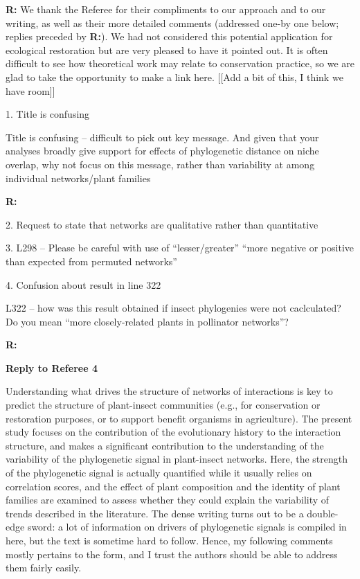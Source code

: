 \documentclass[12pt]{letter}
\newenvironment{refquote}{\bigskip \begin{it}}{\end{it}\smallskip}
\begin{document}
	\textbf{R:} We thank the Referee for their compliments to our approach and to our writing, as well as their more detailed comments (addressed one-by one below; replies preceded by \textbf{R:}). We had not considered this potential application for ecological restoration but are very pleased to have it pointed out. It is often difficult to see how theoretical work may relate to conservation practice, so we are glad to take the opportunity to make a link here. [[Add a bit of this, I think we have room]]

	1. Title is confusing

		\begin{refquote}
			Title is confusing – difficult to pick out key message. And given that your analyses broadly give support for effects of phylogenetic distance on niche overlap, why not focus on this message, rather than variability at among individual networks/plant families
		\end{refquote}


		\textbf{R:} 


	2. Request to state that networks are qualitative rather than quantitative


	3. L298 – Please be careful with use of “lesser/greater” “more negative or positive than expected from permuted networks”


	4. Confusion about result in line 322
		
		\begin{refquote}
			L322 – how was this result obtained if insect phylogenies were not caclculated? Do you mean “more closely-related plants in pollinator networks”?
		\end{refquote}


		\textbf{R:}

\clearpage


{\Large \bf Reply to Referee 4}

	\begin{refquote}
		Understanding what drives the structure of networks of interactions is key to predict the structure of plant-insect communities (e.g., for conservation or restoration purposes, or to support benefit organisms in agriculture).
		The present study focuses on the contribution of the evolutionary history to the interaction structure, and makes a significant contribution to the understanding of the variability of the phylogenetic signal in plant-insect networks. Here, the strength of the phylogenetic signal is actually quantified while it usually relies on correlation scores, and the effect of plant composition and the identity of plant families are examined to assess whether they could explain the variability of trends described in the literature.
		The dense writing turns out to be a double-edge sword: a lot of information on drivers of phylogenetic signals is compiled in here, but the text is sometime hard to follow. Hence, my following comments mostly pertains to the form, and I trust the authors should be able to address them fairly easily.
	\end{refquote}
\end{document}
